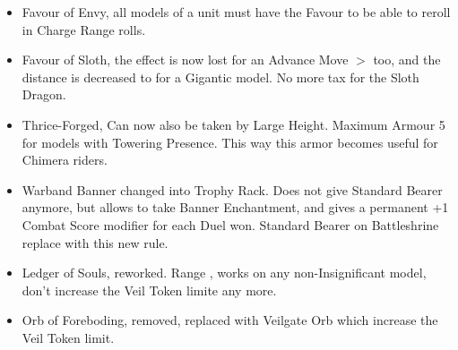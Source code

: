 

\subtitle{2.2}

\subtitle{Redesign and rule changes}

\begin{itemize}
\item Favour of Envy, all models of a unit must have the Favour to be able to reroll  in Charge Range rolls.
\item Favour of Sloth, the effect is now lost for an Advance Move $>$ too, and the distance is decreased to  for a Gigantic model. No more tax for the Sloth Dragon.
\item Thrice-Forged, Can now also be taken by Large Height. Maximum Armour 5 for models with Towering Presence. This way this armor becomes useful for Chimera riders.
\item Warband Banner changed into Trophy Rack. Does not give Standard Bearer anymore, but allows to take Banner Enchantment, and gives a permanent +1 Combat Score modifier for each Duel won. Standard Bearer on Battleshrine replace with this new rule.
\item Ledger of Souls, reworked. Range , works on any non-Insignificant model, don't increase the Veil Token limite any more.
\item Orb of Foreboding, removed, replaced with Veilgate Orb which increase the Veil Token limit.
\end{itemize}

\subtitle{Balance update}

